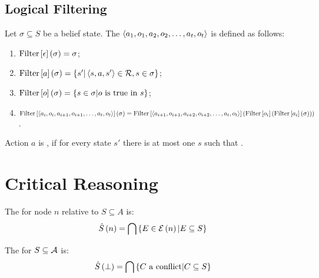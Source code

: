 \subsection{Logical Filtering}

\begin{defi}
Let $\sigma\subseteq S$ be a belief state. The  $\left\langle a_1,o_1,a_2,o_2,\ldots,a_t,o_t\right\rangle$ is defined as follows:
\begin{enumerate}
 \item $\mbox{Filter}\left[ \epsilon\right]\left(\sigma\right)=\sigma$;
 \item $\mbox{Filter}\left[ a\right]\left(\sigma\right)=\left\{ s'|\left\langle s,a,s'\right\rangle\in\mathcal{R},s\in\sigma\right\}$;
 \item $\mbox{Filter}\left[ o\right]\left(\sigma\right)=\left\{ s\in\sigma|o\mbox{ is true in }s\right\}$;
 \item $\mbox{Filter}\left[ \left\langle a_i,o_i,a_{i+1},o_{i+1},\ldots,a_t,o_t\right\rangle\right]\left(\sigma\right)=\mbox{Filter}\left[ \left\langle a_{i+1},o_{i+1},a_{i+2},o_{i+2},\ldots,a_t,o_t\right\rangle\right]\left(\mbox{Filter}\left[ o_i\right]\left(\mbox{Filter}\left[ a_i\right]\left(\sigma\right)\right)\right)$.
\end{enumerate}
\cite{conf/ijcai/AmirR03}
\end{defi}


\begin{defi}
Action $a$ is , if for every state $s'$ there is at most one $s$ such that .
\cite{conf/ijcai/AmirR03}
\end{defi}

\section{Critical Reasoning}

\begin{defi}
The  for node $n$ relative to $S\subseteq A$ is:
\begin{equation}
\hat{S}\left(n\right)=\displaystyle\bigcap\left\{ E\in\mathcal{E}\left(n\right)|E\subseteq S\right\}
\end{equation}
\cite{conf/ijcai/RaimanKS93}
\end{defi}

\begin{defi}
The  for $S\subseteq\mathcal{A}$ is:
\begin{equation}
\hat{S}\left(\bot\right)=\displaystyle\bigcap\left\{ C\mbox{ a conflict}|C\subseteq S\right\}
\end{equation}
\cite{conf/ijcai/RaimanKS93}
\end{defi}

